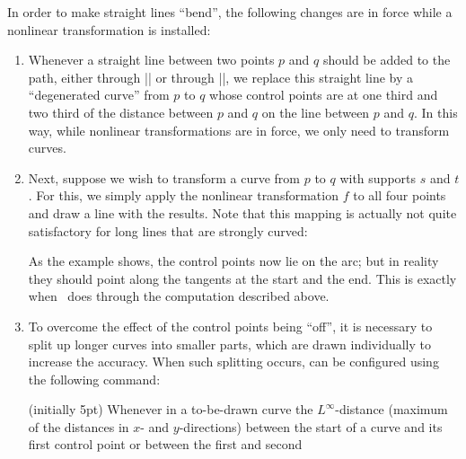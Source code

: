 In order to make straight lines ``bend'', the following changes are in force
while a nonlinear transformation is installed:
%
\begin{enumerate}
    \item Whenever a straight line between two points $p$ and $q$ should be
        added to the path, either through |\pgfpathlineto| or through
        |\pgfpathclose|, we replace this straight line by a ``degenerated
        curve'' from $p$ to $q$ whose control points are at one third and two
        third of the distance between $p$ and $q$ on the line between $p$ and
        $q$. In this way, while nonlinear transformations are in force, we only
        need to transform curves.
    \item Next, suppose we wish to transform a curve from $p$ to $q$ with
        supports $s$ and $t$. For this, we simply apply the nonlinear
        transformation $f$ to all four points and draw a line with the results.
        Note that this mapping is actually not quite satisfactory for long
        lines that are strongly curved:
\begin{codeexample}[]
\end{codeexample}
        As the example shows, the control points now lie on the arc; but in
        reality they should point along the tangents at the start and the end.
        This is exactly when \pgfname\ does through the computation described
        above.
    \item To overcome the effect of the control points being ``off'', it is
        necessary to split up longer curves into smaller parts, which are drawn
        individually to increase the accuracy. When such splitting occurs, can
        be configured using the following command:
        \begin{command}{\pgfsettransformnonlinearflatness{} (initially 5pt)}
            Whenever in a to-be-drawn curve the $L^\infty$-distance (maximum of
            the distances in $x$- and $y$-directions) between the start of a
            curve and its first control point or between the first and second

\end{command}
\end{enumerate}
